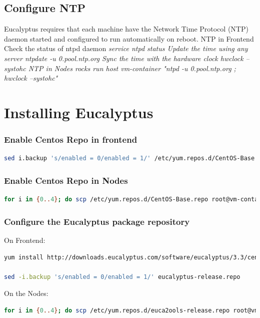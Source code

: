 \section{Configure NTP}

Eucalyptus requires that each machine have the Network Time Protocol (NTP) daemon started and configured to run automatically on reboot.
\linebreak
NTP in Frontend
\linebreak
Check the status of ntpd daemon 
\em{service ntpd status}
\linebreak
Update the time using any server
\em{ntpdate -u 0.pool.ntp.org}
\linebreak
Sync the time with the hardware clock 
\em{hwclock --systohc}
\linebreak
NTP in Nodes
\em{rocks run host vm-container "ntpd -u 0.pool.ntp.org ; hwclock --systohc"}



\chapter{Installing Eucalyptus}
\subsection{Enable Centos Repo in frontend }
\begin{lstlisting}[language=bash]
sed i.backup 's/enabled = 0/enabled = 1/' /etc/yum.repos.d/CentOS-Base.repo
\end{lstlisting}
\subsection{Enable Centos Repo in Nodes }
\begin{lstlisting}[language=bash]
for i in {0..4}; do scp /etc/yum.repos.d/CentOS-Base.repo root@vm-container-0-$i:/etc/yum.repos.d/CentOS-Base.repo; done
\end{lstlisting} 
\subsection{Configure the Eucalyptus package repository} 
On Frontend:
\begin{lstlisting}[language=bash]
yum install http://downloads.eucalyptus.com/software/eucalyptus/3.3/centos/6/x86_64/eucalyptus-release-3.3.noarch.rpm 

sed -i.backup 's/enabled = 0/enabled = 1/' eucalyptus-release.repo 
\end{lstlisting} 
On the Nodes:
\begin{lstlisting}[language=bash]
for i in {0..4}; do scp /etc/yum.repos.d/euca2ools-release.repo root@vm-container-0-$i:/etc/yum.repos.d/euca2ools-release.repo ; done
\end{lstlisting}

